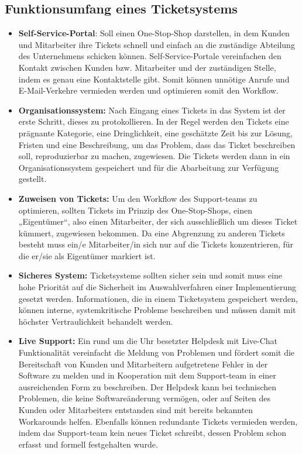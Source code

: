  \subsection{Funktionsumfang eines Ticketsystems}
  
  \begin{itemize}
	  \item 	\textbf{Self-Service-Portal}: Soll einen One-Stop-Shop darstellen, in dem Kunden und Mitarbeiter ihre Tickets schnell und einfach an die zuständige Abteilung des Unternehmens schicken können. Self-Service-Portale vereinfachen den Kontakt zwischen Kunden bzw. Mitarbeiter und der zuständigen Stelle, indem es genau eine Kontaktstelle gibt. Somit können unnötige Anrufe und E-Mail-Verkehre vermieden werden und optimieren somit den Workflow.  \\
	  \item \textbf{	Organisationssystem:} Nach Eingang eines Tickets in das System ist der erste Schritt, dieses zu protokollieren. In der Regel werden den Tickets eine prägnante Kategorie, eine Dringlichkeit, eine geschätzte Zeit bis zur Lösung, Fristen und eine Beschreibung, um das Problem, dass das Ticket beschreiben soll, reproduzierbar zu machen, zugewiesen. Die Tickets werden dann in ein Organisationssystem gespeichert und für die Abarbeitung zur Verfügung gestellt.  \\
	  \item \textbf{Zuweisen von Tickets:} Um den Workflow des Support-teams zu optimieren, sollten Tickets im Prinzip des One-Stop-Shops, einen „Eigentümer“, also einen Mitarbeiter, der sich ausschließlich um dieses Ticket kümmert, zugewiesen bekommen. Da eine Abgrenzung zu anderen Tickets besteht muss ein/e Mitarbeiter/in sich nur auf die Tickets konzentrieren, für die er/sie als Eigentümer markiert ist.\\
	  \item \textbf{	Sicheres System:} Ticketsysteme sollten sicher sein und somit muss eine hohe Priorität auf die Sicherheit im Auswahlverfahren einer Implementierung gesetzt werden. Informationen, die in einem Ticketsystem gespeichert werden, können interne, systemkritische Probleme beschreiben und müssen damit mit höchster Vertraulichkeit behandelt werden. \\
	  \item \textbf{Live Support:} Ein rund um die Uhr besetzter Helpdesk mit Live-Chat Funktionalität vereinfacht die Meldung von Problemen und fördert somit die Bereitschaft von Kunden und Mitarbeitern aufgetretene Fehler in der Software zu melden und in Kooperation mit dem Support-team in einer ausreichenden Form zu beschreiben. Der Helpdesk kann bei technischen Problemen, die keine Softwareänderung vermögen, oder auf Seiten des Kunden oder Mitarbeiters entstanden sind mit bereits bekannten Workarounds helfen. Ebenfalls können redundante Tickets vermieden werden, indem das Support-team kein neues Ticket schreibt, dessen Problem schon erfasst und formell festgehalten wurde. \\
  \end{itemize}
  
